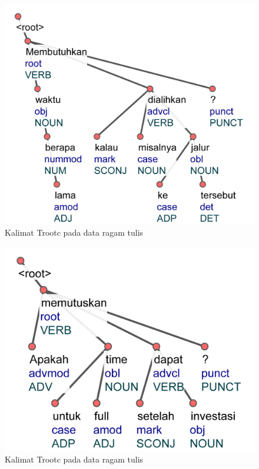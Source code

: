 \begin{figure}
	\centering \includegraphics[width=1
	\textwidth] {pics/ls4820.jpg} 
	\caption{Kalimat Trootc pada data ragam tulis}
	\label{fig:ls4820} 
\end{figure}

\begin{figure}
	\centering \includegraphics[width=1
	\textwidth] {pics/ls1435.jpg} 
	\caption{Kalimat Trootc pada data ragam tulis}
	\label{fig:ls1435} 
\end{figure}

